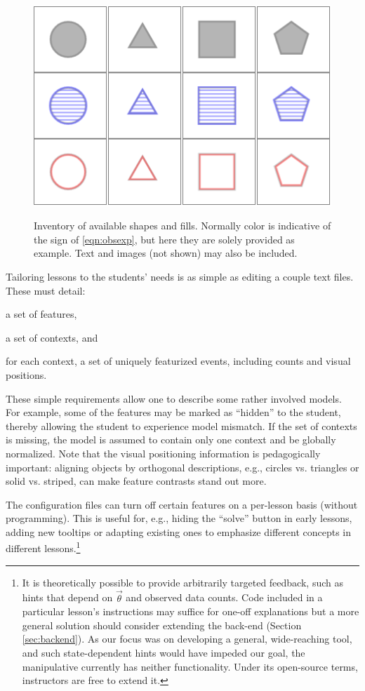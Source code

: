 \documentclass[11pt,letterpaper]{article}
\begin{document}
\begin{figure}[t]
\begin{center}
\centering
\includegraphics[scale=.5]{images/different_shapes_fills3x4.PNG}
\caption{Inventory of available shapes and fills. Normally color is indicative of 
the sign of \eqref{eqn:obsexp}, but here they are solely provided as example. 
Text and images (not shown) may also be included.}
\label{fig:shape_inventory}
\label{fig:inventory}
\end{center}
\end{figure}

Tailoring lessons to the students' needs is as simple as editing a couple text files. These must detail:
\begin{inparaenum}[(1)]
\item a set of features, 
\item a set of contexts, and
\item for each context, a set of uniquely featurized events, including counts and visual positions.
\end{inparaenum}
These simple requirements allow one to describe some rather involved models. For example, some of 
the features may be marked as ``hidden'' to the student, thereby allowing the student to experience 
model mismatch. If the set of contexts is missing, the model is assumed to contain only 
one context and be globally normalized. Note that the visual positioning information is pedagogically 
important: aligning objects by orthogonal descriptions, e.g., circles vs. triangles or solid vs. striped, 
can make feature contrasts stand out more.

The configuration files can turn off certain features on a per-lesson basis (without programming).  This is 
useful for, e.g., hiding the ``solve'' button in early lessons, adding new tooltips or adapting existing 
ones to emphasize different concepts in different lessons.\footnote{It is theoretically possible to provide arbitrarily targeted 
feedback, such as hints that depend on $\vec{\theta}$ and observed data counts. Code included in a particular lesson's instructions 
may suffice for one-off explanations but a more general solution should consider extending the back-end 
(Section \ref{sec:backend}). As our focus was on developing a general, wide-reaching tool, and such state-dependent 
hints would have impeded our goal, the manipulative currently has neither functionality. Under its open-source terms, 
instructors are free to extend it.}
\end{document}
